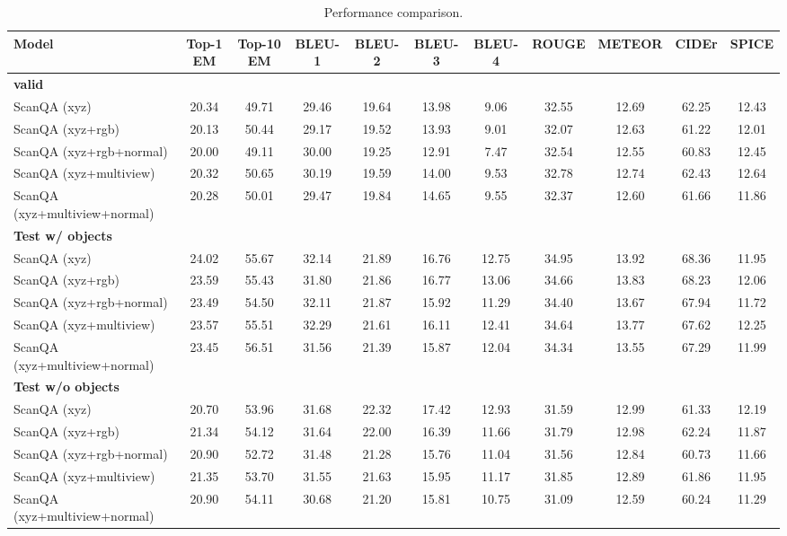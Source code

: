 \begin{table*}[t]
\begin{center}
	\footnotesize\begin{tabular}{lcccccccccc}
        \toprule
Model                & Top-1 EM & Top-10 EM & BLEU-1 & BLEU-2 & BLEU-3 & BLEU-4 & ROUGE & METEOR & CIDEr & SPICE \\
\midrule
\textbf{valid} \\
ScanQA (xyz)  	 &  20.34 & 49.71 & 29.46 & 19.64 & 13.98 & 9.06 & 32.55 & 12.69 & 62.25 & 12.43 \\
ScanQA (xyz+rgb)  	 &  20.13 & 50.44 & 29.17 & 19.52 & 13.93 & 9.01 & 32.07 & 12.63 & 61.22 & 12.01 \\
ScanQA (xyz+rgb+normal)   	 &  20.00 & 49.11 & 30.00 & 19.25 & 12.91 & 7.47 & 32.54 & 12.55 & 60.83 & 12.45 \\
ScanQA (xyz+multiview)  	 &  20.32 & 50.65 & 30.19 & 19.59 & 14.00 & 9.53 & 32.78 & 12.74 & 62.43 & 12.64 \\
ScanQA (xyz+multiview+normal) 	 &  20.28 & 50.01 & 29.47 & 19.84 & 14.65 & 9.55 & 32.37 & 12.60 & 61.66 & 11.86 \\
\midrule
\textbf{Test w/ objects} \\
ScanQA (xyz)  	 &  24.02 & 55.67 & 32.14 & 21.89 & 16.76 & 12.75 & 34.95 & 13.92 & 68.36 & 11.95 \\
ScanQA (xyz+rgb)  	 &  23.59 & 55.43 & 31.80 & 21.86 & 16.77 & 13.06 & 34.66 & 13.83 & 68.23 & 12.06 \\
ScanQA (xyz+rgb+normal)   	 &  23.49 & 54.50 & 32.11 & 21.87 & 15.92 & 11.29 & 34.40 & 13.67 & 67.94 & 11.72 \\
ScanQA (xyz+multiview)  	 &  23.57 & 55.51 & 32.29 & 21.61 & 16.11 & 12.41 & 34.64 & 13.77 & 67.62 & 12.25 \\
ScanQA (xyz+multiview+normal) 	 &  23.45 & 56.51 & 31.56 & 21.39 & 15.87 & 12.04 & 34.34 & 13.55 & 67.29 & 11.99 \\
\midrule
\textbf{Test w/o objects} \\
ScanQA (xyz)  	 &  20.70 & 53.96 & 31.68 & 22.32 & 17.42 & 12.93 & 31.59 & 12.99 & 61.33 & 12.19 \\
ScanQA (xyz+rgb)  	 &  21.34 & 54.12 & 31.64 & 22.00 & 16.39 & 11.66 & 31.79 & 12.98 & 62.24 & 11.87 \\
ScanQA (xyz+rgb+normal)   	 &  20.90 & 52.72 & 31.48 & 21.28 & 15.76 & 11.04 & 31.56 & 12.84 & 60.73 & 11.66 \\
ScanQA (xyz+multiview)  	 &  21.35 & 53.70 & 31.55 & 21.63 & 15.95 & 11.17 & 31.85 & 12.89 & 61.86 & 11.95 \\
ScanQA (xyz+multiview+normal) 	 &  20.90 & 54.11 & 30.68 & 21.20 & 15.81 & 10.75 & 31.09 & 12.59 & 60.24 & 11.29 \\
\bottomrule
	\end{tabular}
    \caption{
        Performance comparison.
    }
\label{table:performance2}
\end{center}
\end{table*}



